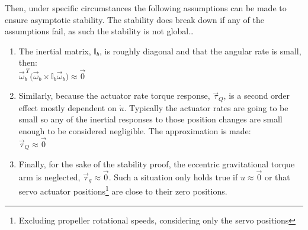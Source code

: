 Then, under specific circumstances the following assumptions can be made to ensure asymptotic stability. The stability does break down if any of the assumptions fail, as such the stability is not global\ldots
\vspace{-10pt}
\begin{enumerate}[itemsep=0em]
\item The inertial matrix, $\mathbb{I}_b$, is roughly diagonal and that the angular rate is small, then:\\
$\vec{\omega}_b^{~T}\big(\vec{\omega}_b\times\mathbb{I}_b\vec{\omega}_b\big)\approx\vec{0}$
\item Similarly, because the actuator rate torque response, $\vec{\tau}_Q$, is a second order effect mostly dependent on $\dot{u}$. Typically the actuator rates are going to be small so any of the inertial responses to those position changes are small enough to be considered negligible. The approximation is made:\\
$\vec{\tau}_Q\approx\vec{0}$
\item Finally, for the sake of the stability proof, the eccentric gravitational torque arm is neglected, $\vec{\tau}_g\approx\vec{0}$. Such a situation only holds true if $u\approx\vec{0}$ or that servo actuator positions\footnote{Excluding propeller rotational speeds, considering only the servo positions} are close to their zero positions.
\end{enumerate}
